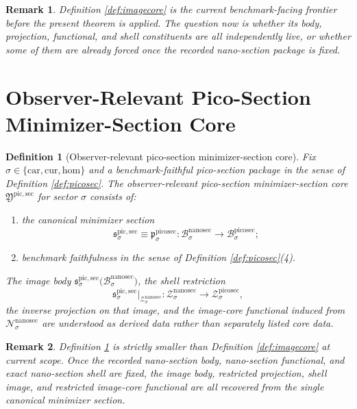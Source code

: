 \documentclass[11pt]{article}
\newcommand{\Car}{\mathrm{car}}
\newcommand{\Cur}{\mathrm{cur}}
\newcommand{\Hom}{\mathrm{hom}}
\newcommand{\NanoSectionBody}[1]{\mathcal B_{#1}^{\mathrm{nanosec}}}
\newcommand{\NanoSectionFunctional}[1]{\mathscr N_{#1}^{\mathrm{nanosec}}}
\newcommand{\NanoSectionShell}[1]{\mathcal Z_{#1}^{\mathrm{nanosec}}}
\newcommand{\PicoSectionBody}[1]{\mathcal B_{#1}^{\mathrm{picosec}}}
\newcommand{\PicoSectionNanoMin}[1]{\mathfrak p_{#1}^{\mathrm{picosec}}}
\newcommand{\PicoSectionShell}[1]{\mathcal Z_{#1}^{\mathrm{picosec}}}
\newcommand{\PicoMinSectionCore}{\mathfrak Y^{\mathrm{pic,sec}}}
\newcommand{\PicoMinSection}[1]{\mathfrak s_{#1}^{\mathrm{pic,sec}}}
\newtheorem{definition}{Definition}
\newtheorem{remark}{Remark}
\begin{document}
\begin{remark}
Definition \ref{def:imagecore} is the current benchmark-facing frontier before the present theorem is applied. The question now is whether its body, projection, functional, and shell constituents are all independently live, or whether some of them are already forced once the recorded nano-section package is fixed.
\end{remark}

\section{Observer-Relevant Pico-Section Minimizer-Section Core}

\begin{definition}[Observer-relevant pico-section minimizer-section core]
\label{def:sectioncore}
Fix \(\sigma\in\{\Car,\Cur,\Hom\}\) and a benchmark-faithful pico-section package in the sense of Definition \ref{def:picosec}. The \emph{observer-relevant pico-section minimizer-section core} \(\PicoMinSectionCore\) for sector \(\sigma\) consists of:
\begin{enumerate}
    \item the canonical minimizer section
    \[
    \PicoMinSection{\sigma}
    \equiv
    \PicoSectionNanoMin{\sigma}
    :
    \NanoSectionBody{\sigma}\to\PicoSectionBody{\sigma};
    \]
    \item benchmark faithfulness in the sense of Definition \ref{def:picosec}(4).
\end{enumerate}
The image body \(\PicoMinSection{\sigma}\bigl(\NanoSectionBody{\sigma}\bigr)\), the shell restriction
\[
\PicoMinSection{\sigma}\big|_{\NanoSectionShell{\sigma}}
:
\NanoSectionShell{\sigma}\to\PicoSectionShell{\sigma},
\]
the inverse projection on that image, and the image-core functional induced from \(\NanoSectionFunctional{\sigma}\) are understood as derived data rather than separately listed core data.
\end{definition}

\begin{remark}
Definition \ref{def:sectioncore} is strictly smaller than Definition \ref{def:imagecore} at current scope. Once the recorded nano-section body, nano-section functional, and exact nano-section shell are fixed, the image body, restricted projection, shell image, and restricted image-core functional are all recovered from the single canonical minimizer section.
\end{remark}
\end{document}
